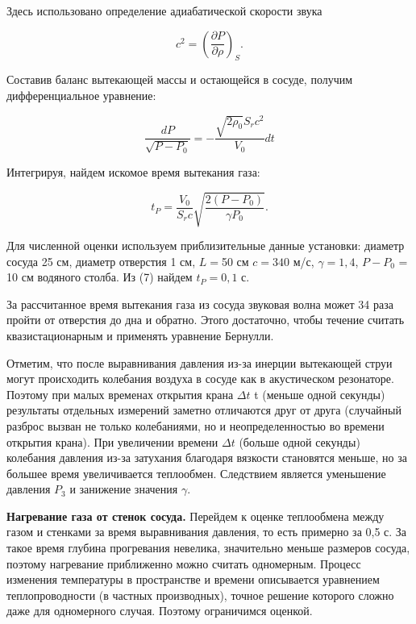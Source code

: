 \documentclass[a4paper,12pt]{article} %
\begin{document}
\noindent Здесь использовано определение адиабатической скорости звука

	\begin{equation*}
		c^2 = \left(\frac{\partial P}{\partial \rho}\right)_{S}.
	\end{equation*}


Составив баланс вытекающей массы и остающейся в сосуде, получим дифференциальное уравнение:

	\begin{equation*}
		\frac{dP}{\sqrt{P - P_{0}}} = -\frac{\sqrt{2\rho_{0}}S_{r}c^2}{V_{0}}dt
	\end{equation*}


Интегрируя, найдем искомое время вытекания газа:

	\begin{equation}
		t_{P} = \frac{V_{0}}{S_{r}c}\sqrt{\frac{2(P - P_{0})}{\gamma P_{0}}}.
	\end{equation}


Для численной оценки используем приблизительные данные установки: диаметр сосуда 25 см, диаметр отверстия 1 см, $L = $50 см $c = 340$ м/с, $\gamma  = 1,4 $, $P - P_{0}$ = 10 см водяного столба. Из (7) найдем $t_{P} = 0,1$ с.


За рассчитанное время вытекания газа из сосуда звуковая волна может 34 раза пройти от отверстия до дна и обратно. Этого достаточно, чтобы течение считать квазистационарным и применять уравнение Бернулли.


Отметим, что после выравнивания давления из-за инерции вытекающей струи могут происходить колебания воздуха в сосуде как в акустическом резонаторе. Поэтому при малых временах открытия крана $\Delta t$ t (меньше одной секунды) результаты отдельных измерений заметно отличаются друг от друга (случайный разброс вызван не только колебаниями, но и неопределенностью во времени открытия крана). При увеличении времени $\Delta t$ (больше одной секунды) колебания давления из-за затухания благодаря вязкости становятся меньше, но за большее время увеличивается теплообмен. Следствием является уменьшение давления $P_{3}$ и занижение значения $\gamma$.


\noindent \textbf{Нагревание газа от стенок сосуда.} Перейдем к оценке теплообмена между газом и стенками за время выравнивания давления, то есть примерно за 0,5 с. За такое время глубина прогревания невелика, значительно меньше размеров сосуда, поэтому нагревание приближенно можно считать одномерным. Процесс изменения температуры в пространстве и времени описывается уравнением теплопроводности (в частных производных), точное решение которого сложно даже для одномерного случая. Поэтому ограничимся оценкой.
\end{document}
